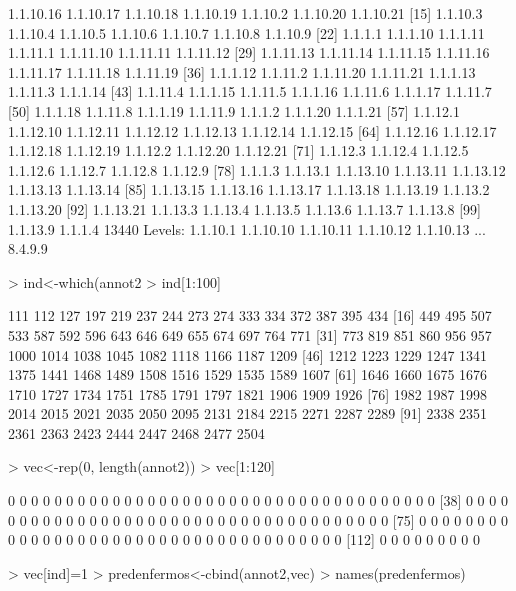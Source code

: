 \documentclass[12pt]{article}
\begin{document}
\begin{Schunk}
\begin{Soutput}
  [8] 1.1.10.16 1.1.10.17 1.1.10.18 1.1.10.19 1.1.10.2  1.1.10.20 1.1.10.21
 [15] 1.1.10.3  1.1.10.4  1.1.10.5  1.1.10.6  1.1.10.7  1.1.10.8  1.1.10.9 
 [22] 1.1.1.1   1.1.1.10  1.1.1.11  1.1.11.1  1.1.11.10 1.1.11.11 1.1.11.12
 [29] 1.1.11.13 1.1.11.14 1.1.11.15 1.1.11.16 1.1.11.17 1.1.11.18 1.1.11.19
 [36] 1.1.1.12  1.1.11.2  1.1.11.20 1.1.11.21 1.1.1.13  1.1.11.3  1.1.1.14 
 [43] 1.1.11.4  1.1.1.15  1.1.11.5  1.1.1.16  1.1.11.6  1.1.1.17  1.1.11.7 
 [50] 1.1.1.18  1.1.11.8  1.1.1.19  1.1.11.9  1.1.1.2   1.1.1.20  1.1.1.21 
 [57] 1.1.12.1  1.1.12.10 1.1.12.11 1.1.12.12 1.1.12.13 1.1.12.14 1.1.12.15
 [64] 1.1.12.16 1.1.12.17 1.1.12.18 1.1.12.19 1.1.12.2  1.1.12.20 1.1.12.21
 [71] 1.1.12.3  1.1.12.4  1.1.12.5  1.1.12.6  1.1.12.7  1.1.12.8  1.1.12.9 
 [78] 1.1.1.3   1.1.13.1  1.1.13.10 1.1.13.11 1.1.13.12 1.1.13.13 1.1.13.14
 [85] 1.1.13.15 1.1.13.16 1.1.13.17 1.1.13.18 1.1.13.19 1.1.13.2  1.1.13.20
 [92] 1.1.13.21 1.1.13.3  1.1.13.4  1.1.13.5  1.1.13.6  1.1.13.7  1.1.13.8 
 [99] 1.1.13.9  1.1.1.4  
13440 Levels: 1.1.10.1 1.1.10.10 1.1.10.11 1.1.10.12 1.1.10.13 ... 8.4.9.9
\end{Soutput}
\begin{Sinput}
> ind<-which(annot2%
> ind[1:100]
\end{Sinput}
\begin{Soutput}
  [1]  111  112  127  197  219  237  244  273  274  333  334  372  387  395  434
 [16]  449  495  507  533  587  592  596  643  646  649  655  674  697  764  771
 [31]  773  819  851  860  956  957 1000 1014 1038 1045 1082 1118 1166 1187 1209
 [46] 1212 1223 1229 1247 1341 1375 1441 1468 1489 1508 1516 1529 1535 1589 1607
 [61] 1646 1660 1675 1676 1710 1727 1734 1751 1785 1791 1797 1821 1906 1909 1926
 [76] 1982 1987 1998 2014 2015 2021 2035 2050 2095 2131 2184 2215 2271 2287 2289
 [91] 2338 2351 2361 2363 2423 2444 2447 2468 2477 2504
\end{Soutput}
\begin{Sinput}
> vec<-rep(0, length(annot2))
> vec[1:120]
\end{Sinput}
\begin{Soutput}
  [1] 0 0 0 0 0 0 0 0 0 0 0 0 0 0 0 0 0 0 0 0 0 0 0 0 0 0 0 0 0 0 0 0 0 0 0 0 0
 [38] 0 0 0 0 0 0 0 0 0 0 0 0 0 0 0 0 0 0 0 0 0 0 0 0 0 0 0 0 0 0 0 0 0 0 0 0 0
 [75] 0 0 0 0 0 0 0 0 0 0 0 0 0 0 0 0 0 0 0 0 0 0 0 0 0 0 0 0 0 0 0 0 0 0 0 0 0
[112] 0 0 0 0 0 0 0 0 0
\end{Soutput}
\begin{Sinput}
> vec[ind]=1
> predenfermos<-cbind(annot2,vec)
> names(predenfermos)
\end{Sinput}

\end{Schunk}
\end{document}

